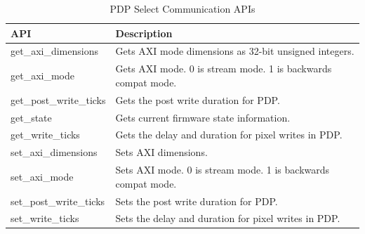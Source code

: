     \begin{table}
        \centering
        \small
        \begin{tabular}{| l l |}
            \hline
            API & Description \\ \hline
            get\_axi\_dimensions     & Gets AXI mode dimensions as 32-bit unsigned integers.        \\
            get\_axi\_mode           & Gets AXI mode. 0 is stream mode. 1 is backwards compat mode. \\
            get\_post\_write\_ticks  & Gets the post write duration for PDP.                        \\
            get\_state               & Gets current firmware state information.                     \\
            get\_write\_ticks        & Gets the delay and duration for pixel writes in PDP.         \\
            set\_axi\_dimensions     & Sets AXI dimensions.                                         \\
            set\_axi\_mode           & Sets AXI mode. 0 is stream mode. 1 is backwards compat mode. \\
            set\_post\_write\_ticks  & Sets the post write duration for PDP.                        \\
            set\_write\_ticks        & Sets the delay and duration for pixel writes in PDP.         \\
            \hline
        \end{tabular}
        \caption{PDP Select Communication APIs}
        \label{tbl:apis}
    \end{table}

